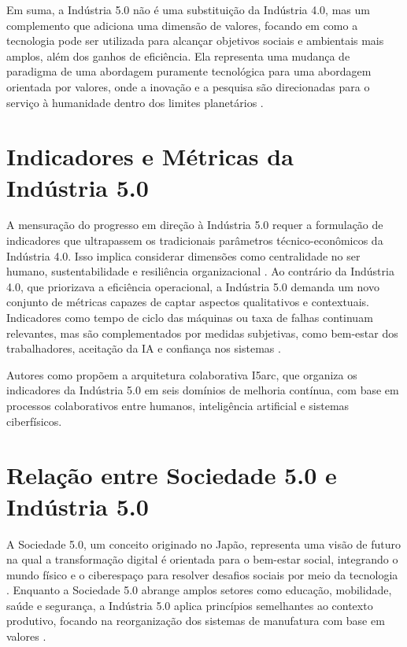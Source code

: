 Em suma, a Indústria 5.0 não é uma substituição da Indústria 4.0, mas um complemento que adiciona uma dimensão de valores, focando em como a tecnologia pode ser utilizada para alcançar objetivos sociais e ambientais mais amplos, além dos ganhos de eficiência. Ela representa uma mudança de paradigma de uma abordagem puramente tecnológica para uma abordagem orientada por valores, onde a inovação e a pesquisa são direcionadas para o serviço à humanidade dentro dos limites planetários \cite{Xu2021, VALETTE2023}.

\section{Indicadores e Métricas da Indústria 5.0}

A mensuração do progresso em direção à Indústria 5.0 requer a formulação de indicadores que ultrapassem os tradicionais parâmetros técnico-econômicos da Indústria 4.0. Isso implica considerar dimensões como centralidade no ser humano, sustentabilidade e resiliência organizacional \cite{euCommission2021, Nahavandi2019}. Ao contrário da Indústria 4.0, que priorizava a eficiência operacional, a Indústria 5.0 demanda um novo conjunto de métricas capazes de captar aspectos qualitativos e contextuais. Indicadores como tempo de ciclo das máquinas ou taxa de falhas continuam relevantes, mas são complementados por medidas subjetivas, como bem-estar dos trabalhadores, aceitação da IA e confiança nos sistemas \cite{TOTH2023}.

Autores como  propõem a arquitetura colaborativa I5arc, que organiza os indicadores da Indústria 5.0 em seis domínios de melhoria contínua, com base em processos colaborativos entre humanos, inteligência artificial e sistemas ciberfísicos.


\section{Relação entre Sociedade 5.0 e Indústria 5.0}

A Sociedade 5.0, um conceito originado no Japão, representa uma visão de futuro na qual a transformação digital é orientada para o bem-estar social, integrando o mundo físico e o ciberespaço para resolver desafios sociais por meio da tecnologia . Enquanto a Sociedade 5.0 abrange amplos setores como educação, mobilidade, saúde e segurança, a Indústria 5.0 aplica princípios semelhantes ao contexto produtivo, focando na reorganização dos sistemas de manufatura com base em valores \cite{Santos2025,Xu2021}.

